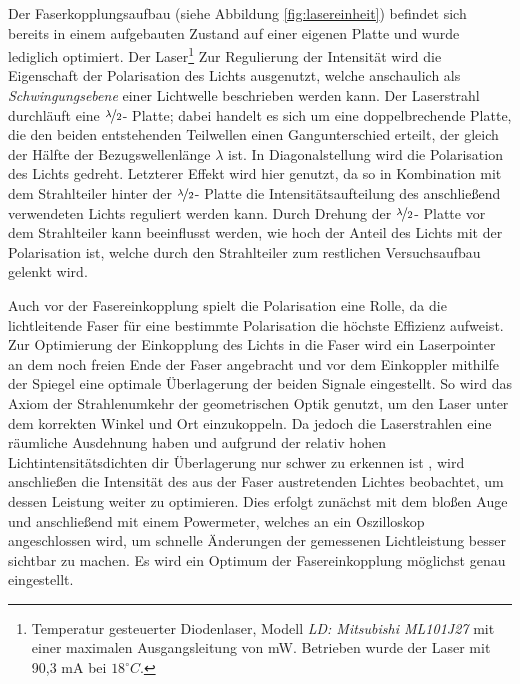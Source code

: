 Der Faserkopplungsaufbau (siehe Abbildung \ref{fig:lasereinheit}) befindet sich bereits in einem aufgebauten Zustand auf einer eigenen Platte und wurde lediglich optimiert. Der Laser\footnote{Temperatur gesteuerter Diodenlaser, Modell  \textit{LD: Mitsubishi ML101J27} mit einer maximalen Ausgangsleitung von \unit[35]{mW}. Betrieben wurde der Laser mit 90,3 mA bei $18^\circ C$.} Zur Regulierung der Intensität wird die Eigenschaft der Polarisation des Lichts ausgenutzt, welche anschaulich als \textit{Schwingungsebene} einer Lichtwelle beschrieben werden kann. Der Laserstrahl durchläuft eine $\nicefrac{\lambda}{2}$- Platte; dabei handelt es sich um eine doppelbrechende Platte, die den beiden entstehenden Teilwellen einen Gangunterschied erteilt, der gleich der Hälfte der Bezugswellenlänge $\lambda$ ist. In Diagonalstellung wird die Polarisation des Lichts gedreht. Letzterer Effekt wird hier genutzt, da so in Kombination mit dem Strahlteiler hinter der  $\nicefrac{\lambda}{2}$- Platte die Intensitätsaufteilung des anschließend verwendeten Lichts reguliert werden kann. Durch Drehung der  $\nicefrac{\lambda}{2}$- Platte vor dem Strahlteiler kann beeinflusst werden, wie hoch der Anteil des Lichts mit der Polarisation ist, welche durch den Strahlteiler zum restlichen Versuchsaufbau gelenkt wird.

Auch vor der Fasereinkopplung spielt die Polarisation eine Rolle, da die lichtleitende Faser für eine bestimmte Polarisation die höchste Effizienz aufweist. \\

Zur Optimierung der Einkopplung des Lichts in die Faser wird ein Laserpointer an dem noch freien Ende der Faser angebracht und vor dem Einkoppler mithilfe der Spiegel eine optimale Überlagerung der beiden Signale eingestellt. So wird das Axiom der Strahlenumkehr der geometrischen Optik genutzt, um den Laser unter dem korrekten Winkel und Ort einzukoppeln. Da jedoch die Laserstrahlen eine räumliche Ausdehnung haben und aufgrund der relativ hohen Lichtintensitätsdichten dir Überlagerung nur schwer zu erkennen ist , wird anschließen die Intensität des aus der Faser austretenden Lichtes beobachtet, um dessen Leistung weiter zu optimieren. Dies erfolgt zunächst mit dem bloßen Auge und anschließend mit einem Powermeter, welches an ein Oszilloskop angeschlossen wird, um schnelle Änderungen der gemessenen Lichtleistung besser sichtbar zu machen. Es wird ein Optimum der Fasereinkopplung möglichst genau eingestellt. 

